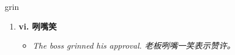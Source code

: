 
\begin{frame}
{\huge grin}
\begin{center}
\begin{enumerate}\Large
  \item \textbf{vi. 咧嘴笑}
  \begin{itemize}
    \item \em{\Large{The boss grinned his approval. 老板咧嘴一笑表示赞许。}}
  \end{itemize}
\end{enumerate}
\end{center}
\end{frame}
